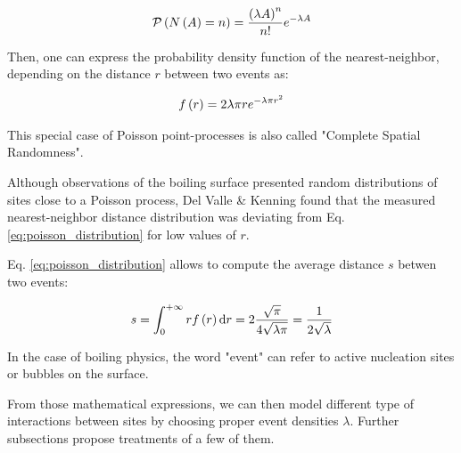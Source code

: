 \begin{equation}
\mathcal{P}\left( N\left( A \right)=n \right)=\frac{\left( \lambda A \right)^{n}}{n!}e^{-\lambda A}
\label{eq:poisson_proba}
\end{equation}

Then, one can express the probability density function of the nearest-neighbor, depending on the distance $r$ between two events as:

\begin{align}
f\left( r \right)=2\lambda \pi r e^{-\lambda \pi r^{2}}
\label{eq:poisson_distribution}
\end{align} 


This special case of Poisson point-processes is also called "Complete Spatial Randomness".


\begin{remark*}{}
Although observations of the boiling surface presented random distributions of sites close to a Poisson process, Del Valle \& Kenning \cite{del_valle_subcooled_1985} found that the measured nearest-neighbor distance distribution was deviating from Eq. \ref{eq:poisson_distribution} for low values of $r$.
\end{remark*}

Eq. \ref{eq:poisson_distribution} allows to compute the average distance $s$ betwen two events:

\begin{equation}
s = \int_{0}^{+\infty} r f\left( r \right)\mathrm{d}r  = 2 \frac{\sqrt{\pi}}{4\sqrt{\lambda \pi}} = \frac{1}{2\sqrt{\lambda}}
\label{eq:poisson_avg_dist}
\end{equation}

\begin{note*}{}
In the case of boiling physics, the word "event" can refer to active nucleation sites or bubbles on the surface.
\end{note*}


\npar

From those mathematical expressions, we can then model different type of interactions between sites by choosing proper event densities $\lambda$. Further subsections propose treatments of a few of them.


%
%
%
%
%
%

